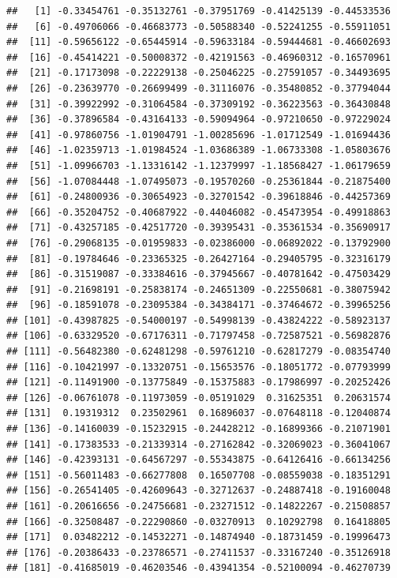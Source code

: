 \documentclass[]{gitbook}
\theoremstyle{definition}
\theoremstyle{definition}
\theoremstyle{definition}
\theoremstyle{remark}
\begin{document}
\begin{verbatim}
##   [1] -0.33454761 -0.35132761 -0.37951769 -0.41425139 -0.44533536
##   [6] -0.49706066 -0.46683773 -0.50588340 -0.52241255 -0.55911051
##  [11] -0.59656122 -0.65445914 -0.59633184 -0.59444681 -0.46602693
##  [16] -0.45414221 -0.50008372 -0.42191563 -0.46960312 -0.16570961
##  [21] -0.17173098 -0.22229138 -0.25046225 -0.27591057 -0.34493695
##  [26] -0.23639770 -0.26699499 -0.31116076 -0.35480852 -0.37794044
##  [31] -0.39922992 -0.31064584 -0.37309192 -0.36223563 -0.36430848
##  [36] -0.37896584 -0.43164133 -0.59094964 -0.97210650 -0.97229024
##  [41] -0.97860756 -1.01904791 -1.00285696 -1.01712549 -1.01694436
##  [46] -1.02359713 -1.01984524 -1.03686389 -1.06733308 -1.05803676
##  [51] -1.09966703 -1.13316142 -1.12379997 -1.18568427 -1.06179659
##  [56] -1.07084448 -1.07495073 -0.19570260 -0.25361844 -0.21875400
##  [61] -0.24800936 -0.30654923 -0.32701542 -0.39618846 -0.44257369
##  [66] -0.35204752 -0.40687922 -0.44046082 -0.45473954 -0.49918863
##  [71] -0.43257185 -0.42517720 -0.39395431 -0.35361534 -0.35690917
##  [76] -0.29068135 -0.01959833 -0.02386000 -0.06892022 -0.13792900
##  [81] -0.19784646 -0.23365325 -0.26427164 -0.29405795 -0.32316179
##  [86] -0.31519087 -0.33384616 -0.37945667 -0.40781642 -0.47503429
##  [91] -0.21698191 -0.25838174 -0.24651309 -0.22550681 -0.38075942
##  [96] -0.18591078 -0.23095384 -0.34384171 -0.37464672 -0.39965256
## [101] -0.43987825 -0.54000197 -0.54998139 -0.43824222 -0.58923137
## [106] -0.63329520 -0.67176311 -0.71797458 -0.72587521 -0.56982876
## [111] -0.56482380 -0.62481298 -0.59761210 -0.62817279 -0.08354740
## [116] -0.10421997 -0.13320751 -0.15653576 -0.18051772 -0.07793999
## [121] -0.11491900 -0.13775849 -0.15375883 -0.17986997 -0.20252426
## [126] -0.06761078 -0.11973059 -0.05191029  0.31625351  0.20631574
## [131]  0.19319312  0.23502961  0.16896037 -0.07648118 -0.12040874
## [136] -0.14160039 -0.15232915 -0.24428212 -0.16899366 -0.21071901
## [141] -0.17383533 -0.21339314 -0.27162842 -0.32069023 -0.36041067
## [146] -0.42393131 -0.64567297 -0.55343875 -0.64126416 -0.66134256
## [151] -0.56011483 -0.66277808  0.16507708 -0.08559038 -0.18351291
## [156] -0.26541405 -0.42609643 -0.32712637 -0.24887418 -0.19160048
## [161] -0.20616656 -0.24756681 -0.23271512 -0.14822267 -0.21508857
## [166] -0.32508487 -0.22290860 -0.03270913  0.10292798  0.16418805
## [171]  0.03482212 -0.14532271 -0.14874940 -0.18731459 -0.19996473
## [176] -0.20386433 -0.23786571 -0.27411537 -0.33167240 -0.35126918
## [181] -0.41685019 -0.46203546 -0.43941354 -0.52100094 -0.46270739

\end{verbatim}
\end{document}
